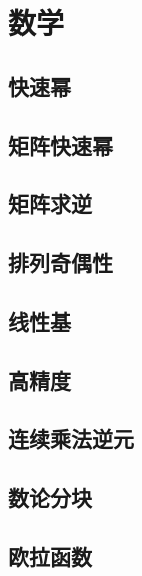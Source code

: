 \documentclass[twocolumn,a4]{article}  %
\begin{document}
	\section{数学}
		\subsection{快速幂}
	 	 	
	 	 	
		\subsection{矩阵快速幂}
	 	 	
	 	 	
		\subsection{矩阵求逆}
	 	 	
	 	 	
		\subsection{排列奇偶性}
	 	 	

		\subsection{线性基}
	 	 	

	 	\subsection{高精度}
	 	 	
	 	 	
	 	\subsection{连续乘法逆元}
	 	 	
	
	 	\subsection{数论分块}
	 	 	
	
	 	\subsection{欧拉函数}
	 	 	
	
\end{document}

